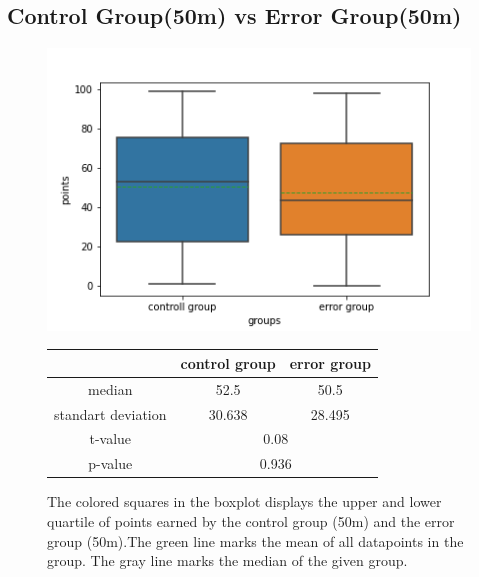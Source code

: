 \documentclass[runningheads]{llncs}
\begin{document}
\subsection{Control Group(50m) vs Error Group(50m) }
\begin{figure}[!h]
    \begin{minipage}{0.43\textwidth}        
        \includegraphics[width=\textwidth]{code/generate/all.png}
        \caption{The colored squares in the boxplot displays
        the upper and lower quartile of points earned by the control group (50m) and
        the error group (50m).The green line marks the mean of all datapoints in the group.
        The gray line marks the median  of the given group.} \label{fig4}
    \end{minipage}
\hfill
\begin{minipage}{0.43\textwidth}
\begin{tabular}[]{| c | c | c |}
        \hline
        & control group & error group \\
        \hline
        median & 52.5&50.5 \\
        \hline
        standart deviation & 30.638&28.495 \\
        \hline
        t-value & \multicolumn{2}{c|}{0.08} \\
        \hline
        p-value & \multicolumn{2}{c|}{0.936} \\
        \hline            
\end{tabular}
\end{minipage}
\end{figure}
\end{document}

